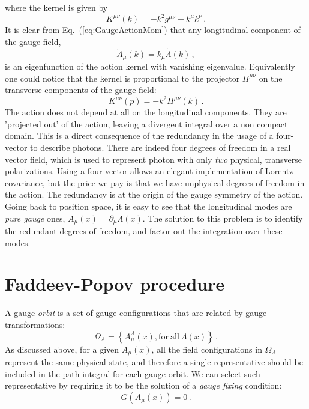 \documentclass[notes]{subfiles}
\renewcommand{\munu}{{\mu\nu}}
\begin{document}
where the kernel is given by
\begin{equation}
  \label{eq:GaugeKernel}
  K^\munu(k) = -k^2 g^\munu + k^\mu k^\nu\, .
\end{equation}
It is clear from Eq.~(\ref{eq:GaugeActionMom}) that any longitudinal
component of the gauge field, 
\[
\tilde{A}_\mu(k) = k_\mu \tilde{\Lambda}(k)\, ,
\]
is an eigenfunction of the action kernel with vanishing
eigenvalue. Equivalently one could notice that the kernel is
proportional to the projector $\Pi^\munu$ on the transverse components
of the gauge field:
\begin{equation}
  \label{eq:GaugeProj}
  K^\munu(p) = -k^2 \Pi^\munu(k)\, .
\end{equation}
The action does not depend at all on the longitudinal components.
They are 'projected out' of the action, leaving a divergent integral
over a non compact domain. This is a direct consequence of the
redundancy in the usage of a four-vector to describe photons. There
are indeed four degrees of freedom in a real vector field, which is
used to represent photon with only \emph{two} physical, transverse
polarizations. Using a four-vector allows an elegant implementation of
Lorentz covariance, but the price we pay is that we have unphysical
degrees of freedom in the action. The redundancy is at the origin of
the gauge symmetry of the action. Going back to position space, it is
easy to see that the longitudinal modes are \emph{pure gauge} ones, \ie
$A_\mu(x)=\partial_\mu \Lambda(x)$. The solution to this problem is to
identify the redundant degrees of freedom, and factor out the
integration over these modes. 

\section{Faddeev-Popov procedure}
\label{sec:fadd-popov-proc}

A gauge \emph{orbit} is a set of gauge configurations that are related
by gauge transformations: 
\begin{equation}
  \label{eq:GaugeOrbit}
  \Omega_A =\left\{
    A^\Lambda_\mu(x), \mathrm{for\ all}\ \Lambda(x)
    \right\}\, .
\end{equation}
As discussed above, for a given $A_\mu(x)$, all the field
configurations in $\Omega_A$ represent the same physical state, and
therefore a single representative should be included in the path
integral for each gauge orbit. We can select such representative by
requiring it to be the solution of a \emph{gauge fixing} condition: 
\begin{equation}
  \label{eq:GaugeFixing}
  G\left(A_\mu(x)\right) = 0\, .
\end{equation}
\end{document}
